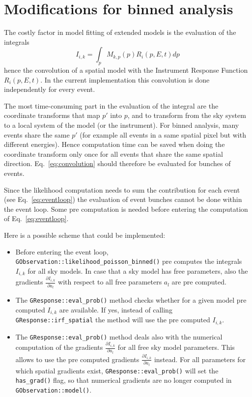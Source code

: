 \documentclass{article}[12pt,a4]
\begin{document}
\section{Modifications for binned analysis}

The costly factor in model fitting of extended models is the evaluation of the integrals
\begin{equation}
I_{i,k} = \int_p M_{k,p}(p) R_i(p,E,t) dp
\label{eq:convolution}
\end{equation}
hence the convolution of a spatial model with the Instrument Response Function $R_i(p,E,t)$.
In the current implementation this convolution is done independently for every event.

The most time-consuming part in the evaluation of the integral are the coordinate transforms that map 
$p'$ into $p$, and to transform from the sky system to a local system of the model (or the instrument).
For binned analysis, many events share the same $p'$ (for example all events in a same spatial pixel
but with different energies).
Hence computation time can be saved when doing the coordinate transform only once for all events that
share the same spatial direction.
Eq.~\ref{eq:convolution} should therefore be evaluated for bunches of events.

Since the likelihood computation needs to sum the contribution for each event (see Eq.~\ref{eq:eventloop})
the evaluation of event bunches cannot be done within the event loop.
Some pre computation is needed before entering the computation of Eq.~\ref{eq:eventloop}.

Here is a possible scheme that could be implemented:
\begin{itemize}
\item Before entering the event loop, {\tt GObservation::likelihood\_poisson\_binned()} pre computes
the integrals $I_{i,k}$ for all sky models. In case that a sky model has free parameters, also the
gradients $\frac{\partial I_{i,k}}{\partial a_l}$ with respect to all free parameters $a_l$ are pre
computed.
\item The {\tt GResponse::eval\_prob()} method checks whether for a given model pre computed
$I_{i,k}$ are available. If yes, instead of calling {\tt GResponse::irf\_spatial} the method will use
the pre computed $I_{i,k}$.
\item The {\tt GResponse::eval\_prob()} method deals also with the numerical computation of the
gradients $\frac{\partial I_{i,k}}{\partial a_l}$ for all free sky model parameters. This allows to use the pre
computed gradients $\frac{\partial I_{i,k}}{\partial a_l}$ instead. For all parameters for which
spatial gradients exist, {\tt GResponse::eval\_prob()} will set the {\tt has\_grad()} flag, so that
numerical gradients are no longer computed in {\tt GObservation::model()}.
\end{itemize}
\end{document}
